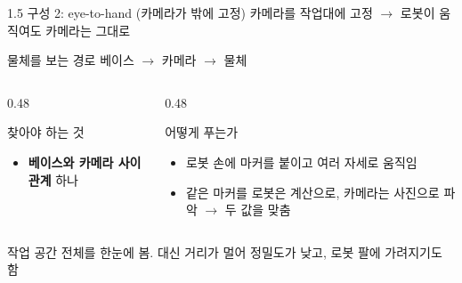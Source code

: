 \documentclass[aspectratio=169,11pt]{beamer}
\begin{document}
\begin{frame}{1.5 구성 2: eye-to-hand (카메라가 밖에 고정)}
  카메라를 작업대에 고정 $\rightarrow$ 로봇이 움직여도 카메라는 그대로
  \vfill
  \begin{block}{물체를 보는 경로}
    \centering
    베이스 $\rightarrow$ 카메라 $\rightarrow$ 물체
  \end{block}
  \vfill
  \begin{columns}[T]
    \begin{column}{0.48\textwidth}
      \begin{block}{찾아야 하는 것}
        \begin{minipage}[t][20mm][t]{\linewidth}
          \begin{itemize}
            \item \textbf{베이스와 카메라 사이 관계} 하나
          \end{itemize}
        \end{minipage}
      \end{block}
    \end{column}
    \begin{column}{0.48\textwidth}
      \begin{block}{어떻게 푸는가}
        \begin{minipage}[t][20mm][t]{\linewidth}
          \begin{itemize}
            \item 로봇 손에 마커를 붙이고 여러 자세로 움직임
            \item 같은 마커를 로봇은 계산으로, 카메라는 사진으로 파악
              $\rightarrow$ 두 값을 맞춤
          \end{itemize}
        \end{minipage}
      \end{block}
    \end{column}
  \end{columns}
  \vfill
  \centering
  작업 공간 전체를 한눈에 봄. 대신 거리가 멀어 정밀도가 낮고, 로봇 팔에 가려지기도 함
\end{frame}
\end{document}
